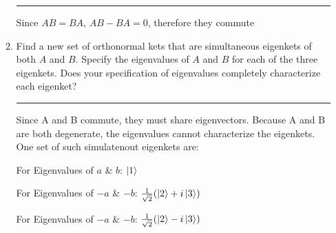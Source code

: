 \documentclass[12pt, oneside]{article}
\newenvironment{answer}
  {\vspace*{0.2cm} \rule{12cm}{0.02cm} \vspace*{0.2cm}}
  {\vspace*{0.2cm}}
\begin{document}
\begin{enumerate}
\begin{enumerate}
\begin{answer}
        Since $AB = BA$, $AB - BA = 0$, therefore they commute
      \end{answer}

      \item Find a new set of orthonormal kets that are simultaneous eigenkets of both $A$ and $B$. Specify the eigenvalues of $A$ and $B$ for each of the three eigenkets. Does your specification of eigenvalues completely characterize each eigenket?

      \begin{answer}
        Since A and B commute, they must share eigenvectors. Because A and B are both degenerate, the eigenvalues cannot characterize the eigenkets. One set of such simulatenout eigenkets are:

        For Eigenvalues of $a$ \& $b$: $\ket{1}$

        For Eigenvalues of $-a$ \& $-b$: $\frac{1}{\sqrt{2}}(\ket{2}+i\ket{3})$
        
        For Eigenvalues of $-a$ \& $-b$: $\frac{1}{\sqrt{2}}(\ket{2}-i\ket{3})$
      \end{answer}
    \end{enumerate}
  \end{enumerate}
\end{document}
